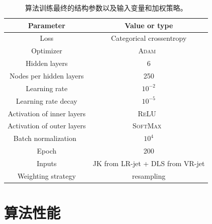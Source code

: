 \begin{table}[ht]
\caption{算法训练最终的结构参数以及输入变量和加权策略。}
\begin{center}
\begin{tabular}{c|c}
    \hline
    \hline
    Parameter & Value or type  \\
    \hline  
    Loss & Categorical crossentropy \\
     \hline  
    Optimizer & \textsc{Adam}~\cite{Kingma:2014} \\
    \hline  
    Hidden layers & 6 \\
    \hline  
    Nodes per hidden layers & 250 \\
    \hline  
    Learning rate & $10^{-2}$\\
    \hline  
    Learning rate decay & $10^{-5}$ \\
    \hline  
    Activation of inner layers & \textsc{ReLU}~\cite{Glorot:2011} \\
    \hline  
    Activation of outer layers & \textsc{SoftMax}~\cite{MLMIT} \\
    \hline  
    Batch normalization~\cite{Ioffe:2015} & $10^{4}$ \\
    \hline  
    Epoch & 200 \\
    \hline  
    Inputs & JK from LR-jet + DLS from VR-jet \\
    \hline  
    Weighting strategy & resampling \\
    \hline
    \hline
\end{tabular}
\end{center}
\label{tab:Final}
\end{table}


\section{算法性能}
\label{sec:XbbPerf}



